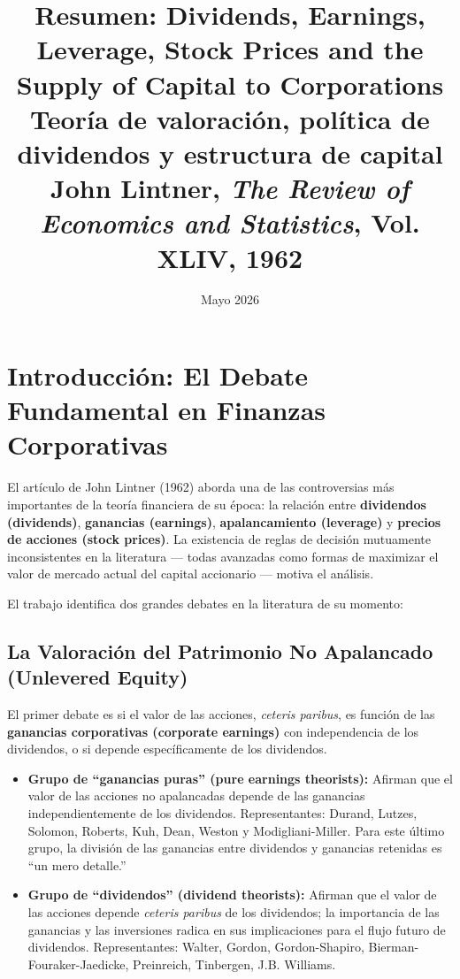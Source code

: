 \documentclass[12pt]{article}
\title{\textbf{Resumen: Dividends, Earnings, Leverage, Stock Prices and the Supply of Capital to Corporations}\\
\large Teor\'ia de valoraci\'on, pol\'itica de dividendos y estructura de capital\\
\normalsize John Lintner, \textit{The Review of Economics and Statistics}, Vol. XLIV, 1962}
\author{}
\date{Mayo 2026}
\begin{document}
\maketitle
\tableofcontents
\newpage

\section{Introducci\'on: El Debate Fundamental en Finanzas Corporativas}

El art\'iculo de John Lintner (1962) aborda una de las controversias m\'as importantes de la teor\'ia financiera de su \'epoca: la relaci\'on entre \textbf{dividendos (dividends)}, \textbf{ganancias (earnings)}, \textbf{apalancamiento (leverage)} y \textbf{precios de acciones (stock prices)}. La existencia de reglas de decisi\'on mutuamente inconsistentes en la literatura --- todas avanzadas como formas de maximizar el valor de mercado actual del capital accionario --- motiva el an\'alisis.

El trabajo identifica dos grandes debates en la literatura de su momento:

\subsection{La Valoraci\'on del Patrimonio No Apalancado (Unlevered Equity)}

El primer debate es si el valor de las acciones, \textit{ceteris paribus}, es funci\'on de las \textbf{ganancias corporativas (corporate earnings)} con independencia de los dividendos, o si depende espec\'ificamente de los dividendos.

\begin{itemize}
  \item \textbf{Grupo de ``ganancias puras'' (pure earnings theorists):} Afirman que el valor de las acciones no apalancadas depende de las ganancias independientemente de los dividendos. Representantes: Durand, Lutzes, Solomon, Roberts, Kuh, Dean, Weston y Modigliani-Miller. Para este \'ultimo grupo, la divisi\'on de las ganancias entre dividendos y ganancias retenidas es ``un mero detalle.''

  \item \textbf{Grupo de ``dividendos'' (dividend theorists):} Afirman que el valor de las acciones depende \textit{ceteris paribus} de los dividendos; la importancia de las ganancias y las inversiones radica en sus implicaciones para el flujo futuro de dividendos. Representantes: Walter, Gordon, Gordon-Shapiro, Bierman-Fouraker-Jaedicke, Preinreich, Tinbergen, J.B. Williams.
\end{itemize}
\end{document}
